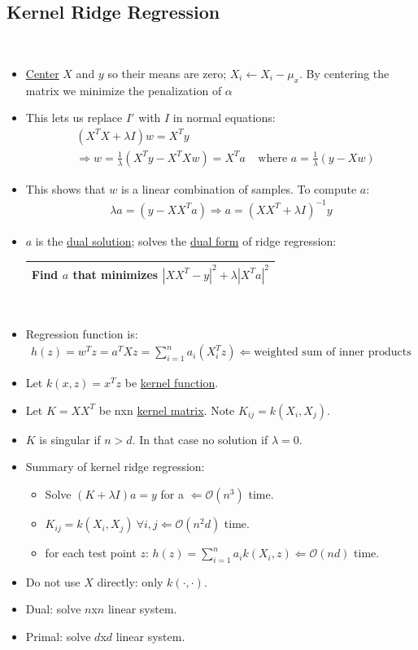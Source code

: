 \documentclass[10pt]{article}
\begin{document}
	\subsection*{Kernel Ridge Regression}
	\
	\begin{itemize}
		\item \underline{Center} $X$ and $y$ so their means are zero; $X_{i} \leftarrow X_{i} - \mu_{x}$. By centering the matrix we minimize the penalization of $\alpha$
		\item This lets us replace $I'$ with $I$ in normal equations:
			\begin{align*}
				&(X^{T}X + \lambda I)w = X^{T}y\\
				&\Rightarrow w = \frac{1}{\lambda}(X^{T}y - X^{T}Xw) = X^{T}a  \ \ \ \ \ \text{where } a = \frac{1}{\lambda}(y-Xw)
			\end{align*}
		\item This shows that $w$ is a linear combination of samples. To compute $a$:
			\begin{align*}
				\lambda a = (y - XX^{T}a) \Rightarrow a = (XX^{T} + \lambda I)^{-1}y
			\end{align*}
		\item $a$ is the \underline{dual solution}; solves the \underline{dual form} of ridge regression:
		\begin{center}
			\begin{tabular}{|c|}
				\hline
				Find $a$ that minimizes $|XX^{T} - y|^{2} + \lambda|X^{T}a|^{2}$\\
				\hline
			\end{tabular}\\
		\end{center}
		\item Regression function is:
			\begin{align*}
				h(z) = w^{T}z = a^{T}Xz = \sum_{i=1}^{n} a_{i}(X_{i}^{T}z) \Leftarrow \text{weighted sum of inner products}
			\end{align*}
		\item Let $k(x, z) = x^{T}z$ be \underline{kernel function}.
		\item Let $K = XX^{T}$ be nxn \underline{kernel matrix}. Note $K_{ij} = k(X_{i}, X_{j})$.
		\item $K$ is singular if $n>d$. In that case no solution if $\lambda = 0$.
		\item Summary of kernel ridge regression:
			\begin{itemize}
				\item Solve $(K + \lambda I)a = y$  for a $\Leftarrow \mathcal{O}(n^{3})$ time.
				\item $K_{ij} = k(X_{i}, X_{j}) \ \forall i,j \Leftarrow \mathcal{O}(n^{2}d)$ time.
				\item for each test point $z$: $h(z) = \sum_{i=1}^{n} a_{i} k(X_{i}, z) \Leftarrow \mathcal{O}(nd)$ time.
			\end{itemize}
		\item Do not use $X$ directly: only $k(\cdot , \cdot)$.
		\item Dual: solve $n$x$n$ linear system.
		\item Primal: solve $d$x$d$ linear system.
	\end{itemize}
	
\end{document}
